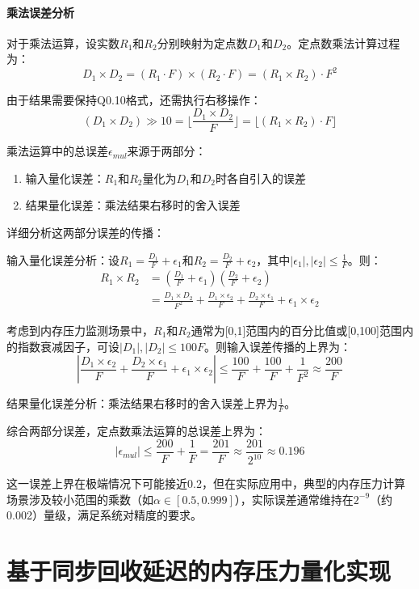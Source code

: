 \paragraph{乘法误差分析}\quad
对于乘法运算，设实数$R_1$和$R_2$分别映射为定点数$D_1$和$D_2$。定点数乘法计算过程为：
\[
D_1 \times D_2 = (R_1 \cdot F) \times (R_2 \cdot F) = (R_1 \times R_2) \cdot F^2
\]

由于结果需要保持Q0.10格式，还需执行右移操作：
\[
(D_1 \times D_2) \gg 10 = \lfloor \frac{D_1 \times D_2}{F} \rfloor = \lfloor (R_1 \times R_2) \cdot F \rfloor
\]

乘法运算中的总误差$\epsilon_{mul}$来源于两部分：
\begin{enumerate}
    \item 输入量化误差：$R_1$和$R_2$量化为$D_1$和$D_2$时各自引入的误差
    \item 结果量化误差：乘法结果右移时的舍入误差
\end{enumerate}

详细分析这两部分误差的传播：

输入量化误差分析：设$R_1 = \frac{D_1}{F} + \epsilon_1$和$R_2 = \frac{D_2}{F} + \epsilon_2$，其中$|\epsilon_1|, |\epsilon_2| \leq \frac{1}{F}$。则：
\[
\begin{aligned}
R_1 \times R_2 &= (\frac{D_1}{F} + \epsilon_1)(\frac{D_2}{F} + \epsilon_2) \\
&= \frac{D_1 \times D_2}{F^2} + \frac{D_1 \times \epsilon_2}{F} + \frac{D_2 \times \epsilon_1}{F} + \epsilon_1 \times \epsilon_2
\end{aligned}
\]

考虑到内存压力监测场景中，$R_1$和$R_2$通常为[0,1]范围内的百分比值或[0,100]范围内的指数衰减因子，可设$|D_1|, |D_2| \leq 100F$。则输入误差传播的上界为：
\[
|\frac{D_1 \times \epsilon_2}{F} + \frac{D_2 \times \epsilon_1}{F} + \epsilon_1 \times \epsilon_2| \leq \frac{100}{F} + \frac{100}{F} + \frac{1}{F^2} \approx \frac{200}{F}
\]

结果量化误差分析：乘法结果右移时的舍入误差上界为$\frac{1}{F}$。

综合两部分误差，定点数乘法运算的总误差上界为：
\[
|\epsilon_{mul}| \leq \frac{200}{F} + \frac{1}{F} = \frac{201}{F} \approx \frac{201}{2^{10}} \approx 0.196
\]

这一误差上界在极端情况下可能接近0.2，但在实际应用中，典型的内存压力计算场景涉及较小范围的乘数（如$\alpha \in [0.5, 0.999]$），实际误差通常维持在$2^{-9}$（约0.002）量级，满足系统对精度的要求。

\section{基于同步回收延迟的内存压力量化实现}
\label{sec:基于同步回收延迟的内存压力量化实现}

